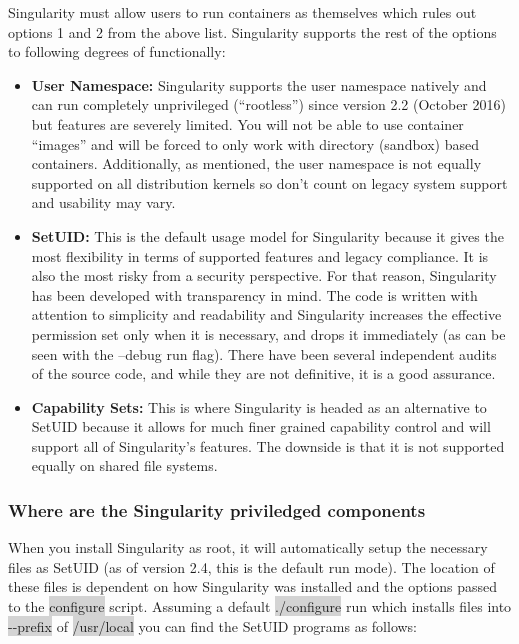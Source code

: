 \documentclass[a4paper]{article}
\newcounter{subsubsubsection}[subsubsection]
\begin{document}

Singularity must allow users to run containers as themselves which rules out options 1 and 2 from the above list. Singularity supports the rest of the options to following degrees of functionally:

\begin{itemize}
\item \textbf{User Namespace:} Singularity supports the user namespace natively and can run completely unprivileged (“rootless”) since version 2.2 (October 2016) but features are severely limited. You will not be able to use container “images” and will be forced to only work with directory (sandbox) based containers. Additionally, as mentioned, the user namespace is not equally supported on all distribution kernels so don’t count on legacy system support and usability may vary.
\item \textbf{SetUID:} This is the default usage model for Singularity because it gives the most flexibility in terms of supported features and legacy compliance. It is also the most risky from a security perspective. For that reason, Singularity has been developed with transparency in mind. The code is written with attention to simplicity and readability and Singularity increases the effective permission set only when it is necessary, and drops it immediately (as can be seen with the --debug run flag). There have been several independent audits of the source code, and while they are not definitive, it is a good assurance.
\item \textbf{Capability Sets:} This is where Singularity is headed as an alternative to SetUID because it allows for much finer grained capability control and will support all of Singularity’s features. The downside is that it is not supported equally on shared file systems.

\end{itemize}

\subsubsection{Where are the Singularity priviledged components}

When you install Singularity as root, it will automatically setup the necessary files as SetUID (as of version 2.4, this is the default run mode). The location of these files is dependent on how Singularity was installed and the options passed to the \colorbox{lightgray}{configure} script. Assuming a default \colorbox{lightgray}{./configure} run which installs files into \colorbox{lightgray}{-{}-prefix} of \colorbox{lightgray}{/usr/local} you can find the SetUID programs as follows:
\end{document}
